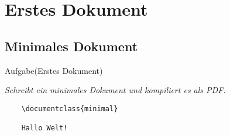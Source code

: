 \section{Erstes Dokument}
\subsection{Minimales Dokument}
{\large Aufgabe(Erstes Dokument)}

\textit{Schreibt ein minimales Dokument und kompiliert es als PDF.}

\begin{verbatim}
    \documentclass{minimal}
    
    Hallo Welt!
    
\end{verbatim}

\newpage
